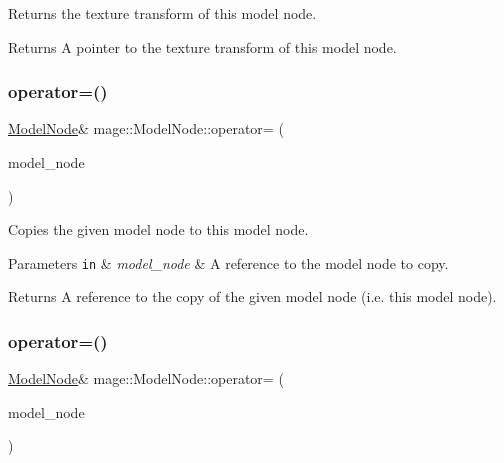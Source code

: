 Returns the texture transform of this model node.

\begin{DoxyReturn}{Returns}
A pointer to the texture transform of this model node. 
\end{DoxyReturn}
\hypertarget{classmage_1_1_model_node_ad8378279b79930dfe98d176dbc1c5db9}{}\label{classmage_1_1_model_node_ad8378279b79930dfe98d176dbc1c5db9} 
\subsubsection{\texorpdfstring{operator=()}{operator=()}\hspace{0.1cm}{\footnotesize\ttfamily [1/2]}}
{\footnotesize\ttfamily \hyperlink{classmage_1_1_model_node}{Model\+Node}\& mage\+::\+Model\+Node\+::operator= (\begin{DoxyParamCaption}\item[{const \hyperlink{classmage_1_1_model_node}{Model\+Node} \&}]{model\+\_\+node }\end{DoxyParamCaption})\hspace{0.3cm}{\ttfamily [delete]}}

Copies the given model node to this model node.


\begin{DoxyParams}[1]{Parameters}
\mbox{\tt in}  & {\em model\+\_\+node} & A reference to the model node to copy. \\
\hline
\end{DoxyParams}
\begin{DoxyReturn}{Returns}
A reference to the copy of the given model node (i.\+e. this model node). 
\end{DoxyReturn}
\hypertarget{classmage_1_1_model_node_ad39321f4d392aa4e28169b8d7a08af68}{}\label{classmage_1_1_model_node_ad39321f4d392aa4e28169b8d7a08af68} 
\subsubsection{\texorpdfstring{operator=()}{operator=()}\hspace{0.1cm}{\footnotesize\ttfamily [2/2]}}
{\footnotesize\ttfamily \hyperlink{classmage_1_1_model_node}{Model\+Node}\& mage\+::\+Model\+Node\+::operator= (\begin{DoxyParamCaption}\item[{\hyperlink{classmage_1_1_model_node}{Model\+Node} \&\&}]{model\+\_\+node }\end{DoxyParamCaption})\hspace{0.3cm}{\ttfamily [delete]}}


